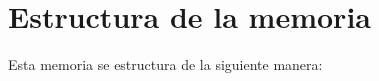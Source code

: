 \documentclass[a4paper, 12pt]{book}
\begin{document}











\section{Estructura de la memoria}
\label{sec:estructura}

Esta memoria se estructura de la siguiente manera:
\end{document}
